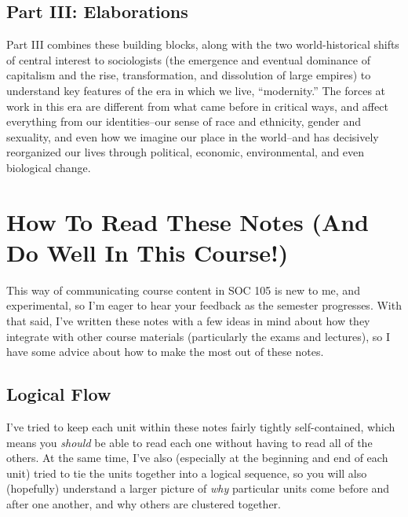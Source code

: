 \documentclass[
  letterpaper,
  DIV=11,
  numbers=noendperiod,
  oneside]{scrartcl}
\begin{document}
\subsection{Part III: Elaborations}\label{part-iii-elaborations}

Part III combines these building blocks, along with the two
world-historical shifts of central interest to sociologists (the
emergence and eventual dominance of capitalism and the rise,
transformation, and dissolution of large empires) to understand key
features of the era in which we live, ``modernity.'' The forces at work
in this era are different from what came before in critical ways, and
affect everything from our identities--our sense of race and
ethnicity, gender and sexuality, and even
how we imagine our place in the world--and has
decisively reorganized our lives through political, economic,
environmental, and even
biological change.

\section{How To Read These Notes (And Do Well In This
Course!)}\label{how-to-read-these-notes-and-do-well-in-this-course}

This way of communicating course content in SOC 105 is new to me, and
experimental, so I'm eager to hear your feedback as the semester
progresses. With that said, I've written these notes with a few ideas in
mind about how they integrate with other course materials (particularly
the exams and lectures), so I have some advice about how to make the
most out of these notes.

\subsection{Logical Flow}\label{logical-flow}

I've tried to keep each unit within these notes fairly tightly
self-contained, which means you \emph{should} be able to read each one
without having to read all of the others. At the same time, I've also
(especially at the beginning and end of each unit) tried to tie the
units together into a logical sequence, so you will also (hopefully)
understand a larger picture of \emph{why} particular units come before
and after one another, and why others are clustered together.
\end{document}

